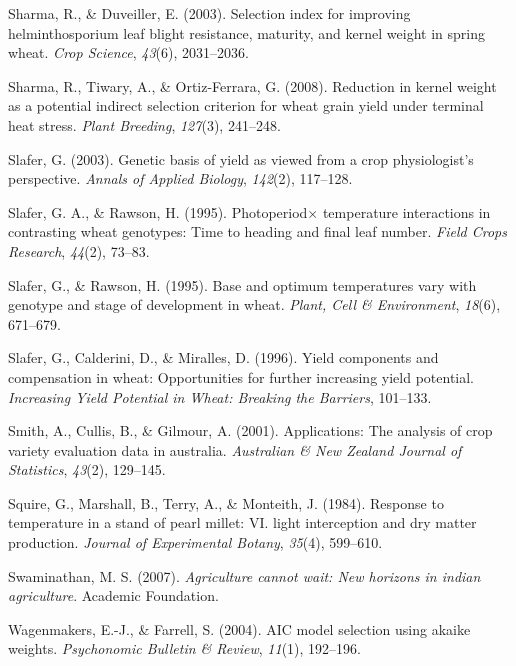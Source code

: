 \documentclass[12pt,oneside]{dukestatscithesis} %
\theoremstyle{definition}
\theoremstyle{definition}
\theoremstyle{definition}
\theoremstyle{remark}
\begin{document}
\hypertarget{ref-sharma2003selection}{}
Sharma, R., \& Duveiller, E. (2003). Selection index for improving
helminthosporium leaf blight resistance, maturity, and kernel weight in
spring wheat. \emph{Crop Science}, \emph{43}(6), 2031--2036.

\hypertarget{ref-sharma2008reduction}{}
Sharma, R., Tiwary, A., \& Ortiz-Ferrara, G. (2008). Reduction in kernel
weight as a potential indirect selection criterion for wheat grain yield
under terminal heat stress. \emph{Plant Breeding}, \emph{127}(3),
241--248.

\hypertarget{ref-slafer2003genetic}{}
Slafer, G. (2003). Genetic basis of yield as viewed from a crop
physiologist's perspective. \emph{Annals of Applied Biology},
\emph{142}(2), 117--128.

\hypertarget{ref-slafer1995photoperiod}{}
Slafer, G. A., \& Rawson, H. (1995). Photoperiod\(\times\) temperature
interactions in contrasting wheat genotypes: Time to heading and final
leaf number. \emph{Field Crops Research}, \emph{44}(2), 73--83.

\hypertarget{ref-slafer1995base}{}
Slafer, G., \& Rawson, H. (1995). Base and optimum temperatures vary
with genotype and stage of development in wheat. \emph{Plant, Cell \&
Environment}, \emph{18}(6), 671--679.

\hypertarget{ref-slafer1996yield}{}
Slafer, G., Calderini, D., \& Miralles, D. (1996). Yield components and
compensation in wheat: Opportunities for further increasing yield
potential. \emph{Increasing Yield Potential in Wheat: Breaking the
Barriers}, 101--133.

\hypertarget{ref-smith2001applications}{}
Smith, A., Cullis, B., \& Gilmour, A. (2001). Applications: The analysis
of crop variety evaluation data in australia. \emph{Australian \& New
Zealand Journal of Statistics}, \emph{43}(2), 129--145.

\hypertarget{ref-squire1984response}{}
Squire, G., Marshall, B., Terry, A., \& Monteith, J. (1984). Response to
temperature in a stand of pearl millet: VI. light interception and dry
matter production. \emph{Journal of Experimental Botany}, \emph{35}(4),
599--610.

\hypertarget{ref-swaminathan2007agriculture}{}
Swaminathan, M. S. (2007). \emph{Agriculture cannot wait: New horizons
in indian agriculture}. Academic Foundation.

\hypertarget{ref-wagenmakers2004aic}{}
Wagenmakers, E.-J., \& Farrell, S. (2004). AIC model selection using
akaike weights. \emph{Psychonomic Bulletin \& Review}, \emph{11}(1),
192--196.
\end{document}
